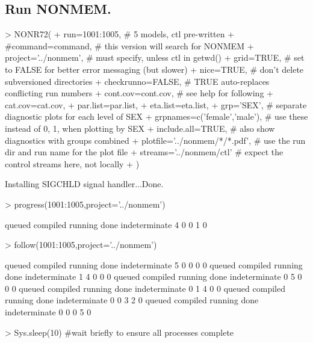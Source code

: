 \subsection{Run NONMEM.}
\begin{Schunk}
\begin{Sinput}
> NONR72(
+      run=1001:1005,                       # 5 models, ctl pre-written
+      #command=command,                    # this version will search for NONMEM
+      project='../nonmem',                 # must specify, unless ctl in getwd()
+      grid=TRUE,                          # set to FALSE for better error messaging (but slower)
+      nice=TRUE,                           # don't delete subversioned directories
+      checkrunno=FALSE,                    # TRUE auto-replaces conflicting run numbers
+      cont.cov=cont.cov,                   # see help for following
+      cat.cov=cat.cov,
+      par.list=par.list,
+      eta.list=eta.list,
+      grp='SEX',                           # separate diagnostic plots for each level of SEX
+      grpnames=c('female','male'),         # use these instead of 0, 1, when plotting by SEX
+      include.all=TRUE,                    # also show diagnostics with groups combined
+      plotfile='../nonmem/*/*.pdf',        # use the run dir and run name for the plot file 
+      streams='../nonmem/ctl'              # expect the control streams here, not locally
+ )
\end{Sinput}
\begin{Soutput}
Installing SIGCHLD signal handler...Done.
\end{Soutput}
\begin{Sinput}
> progress(1001:1005,project='../nonmem')
\end{Sinput}
\begin{Soutput}
       queued      compiled       running          done indeterminate 
            4             0             0             1             0 
\end{Soutput}
\begin{Sinput}
> follow(1001:1005,project='../nonmem')
\end{Sinput}
\begin{Soutput}
       queued      compiled       running          done indeterminate 
            5             0             0             0             0 
       queued      compiled       running          done indeterminate 
            1             4             0             0             0 
       queued      compiled       running          done indeterminate 
            0             5             0             0             0 
       queued      compiled       running          done indeterminate 
            0             1             4             0             0 
       queued      compiled       running          done indeterminate 
            0             0             3             2             0 
       queued      compiled       running          done indeterminate 
            0             0             0             5             0 
\end{Soutput}
\begin{Sinput}
> Sys.sleep(10)                             #wait briefly to ensure all processes complete
\end{Sinput}
\end{Schunk}
